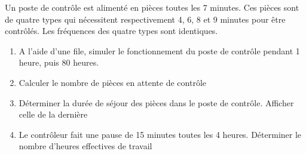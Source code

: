 \documentclass[12pt,fleqn]{article} %
\begin{document}
\begin{exercise}
	Un poste de contrôle est alimenté en pièces toutes les 7 minutes. Ces pièces sont de quatre types qui nécessitent respectivement
	4, 6, 8 et 9 minutes pour être contrôlés. Les fréquences des quatre types sont identiques.
	\begin{enumerate}
		\item A l’aide d’une file, simuler le fonctionnement du poste de contrôle pendant 1 heure, puis 80 heures.
		\item Calculer le nombre de pièces en attente de contrôle
		\item Déterminer la durée de séjour des pièces dans le poste de contrôle. Afficher celle de la dernière
		\item Le contrôleur fait une pause de 15 minutes toutes les 4 heures. Déterminer le nombre d’heures effectives de travail
	\end{enumerate}
\end{exercise}
\begin{comment}
\subsection{Exercice}


\begin{exercise}
\begin{enumerate}
\item Initialiser une variable $\mu$ (vous pouvez écrire mu) et $\nu$ (vous pouvez écrire nu). Importer le module random et mettre dans une arrivée,random.expovariate(mu) et dans une variable service random.expovariate(nu)
\item Faire une fonction qui prend en entrée un entier $n$ et qui renvoie une liste de temps d'arrivée en ajoutant à chaque fois une autre variable random.expovariate(mu)
\item Faire une File (qui sera une file d'attente) avec les méthodes vus précédemment. On lui ajoutera comme attribut mu et nu.
\item Faire une classe Individu avec comme attribut un numéro (qui augmente chaque fois de 1) et un temps de service (que l'on définira plus tard) et un temps d'arrivée.

\item Faire une méthode qui prend en entrée un temps de fin $t_{\text{fin}}$ qui simule les temps d'arrivée et de service et qui ajoute les individus qui arrivent et enlève les individus qui ont été servis. (Il peut être utile de faire "couler" du temps, faire une variable temps qui s'incrémente et qui permet de gérer les évènements)
\end{enumerate}
\end{exercise}
\end{comment}
\end{document}
